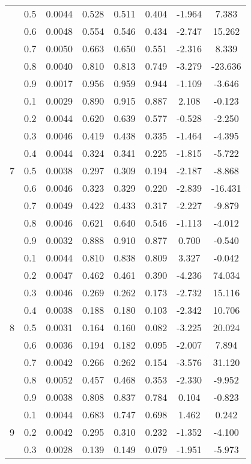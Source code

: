 \documentclass[11pt,a4paper]{report}
\begin{document}
\begin{longtable}{ | c | c || c | c | c | c | c | c | }
 & 0.5 & 0.0044 & 0.528 & 0.511 & 0.404 & -1.964 & 7.383 \\
 & 0.6 & 0.0048 & 0.554 & 0.546 & 0.434 & -2.747 & 15.262 \\
 & 0.7 & 0.0050 & 0.663 & 0.650 & 0.551 & -2.316 & 8.339 \\
 & 0.8 & 0.0040 & 0.810 & 0.813 & 0.749 & -3.279 & -23.636 \\
 & 0.9 & 0.0017 & 0.956 & 0.959 & 0.944 & -1.109 & -3.646 \\
 \hline
\multirow{9}{*}{7} & 0.1 & 0.0029 & 0.890 & 0.915 & 0.887 & 2.108 & -0.123 \\
 & 0.2 & 0.0044 & 0.620 & 0.639 & 0.577 & -0.528 & -2.250 \\
 & 0.3 & 0.0046 & 0.419 & 0.438 & 0.335 & -1.464 & -4.395 \\
 & 0.4 & 0.0044 & 0.324 & 0.341 & 0.225 & -1.815 & -5.722 \\
 & 0.5 & 0.0038 & 0.297 & 0.309 & 0.194 & -2.187 & -8.868 \\
 & 0.6 & 0.0046 & 0.323 & 0.329 & 0.220 & -2.839 & -16.431 \\
 & 0.7 & 0.0049 & 0.422 & 0.433 & 0.317 & -2.227 & -9.879 \\
 & 0.8 & 0.0046 & 0.621 & 0.640 & 0.546 & -1.113 & -4.012 \\
 & 0.9 & 0.0032 & 0.888 & 0.910 & 0.877 & 0.700 & -0.540 \\
 \hline
\multirow{9}{*}{8} & 0.1 & 0.0044 & 0.810 & 0.838 & 0.809 & 3.327 & -0.042 \\
 & 0.2 & 0.0047 & 0.462 & 0.461 & 0.390 & -4.236 & 74.034 \\
 & 0.3 & 0.0046 & 0.269 & 0.262 & 0.173 & -2.732 & 15.116 \\
 & 0.4 & 0.0038 & 0.188 & 0.180 & 0.103 & -2.342 & 10.706 \\
 & 0.5 & 0.0031 & 0.164 & 0.160 & 0.082 & -3.225 & 20.024 \\
 & 0.6 & 0.0036 & 0.194 & 0.182 & 0.095 & -2.007 & 7.894 \\
 & 0.7 & 0.0042 & 0.266 & 0.262 & 0.154 & -3.576 & 31.120 \\
 & 0.8 & 0.0052 & 0.457 & 0.468 & 0.353 & -2.330 & -9.952 \\
 & 0.9 & 0.0038 & 0.808 & 0.837 & 0.784 & 0.104 & -0.823 \\
 \hline
\multirow{9}{*}{9} & 0.1 & 0.0044 & 0.683 & 0.747 & 0.698 & 1.462 & 0.242 \\
 & 0.2 & 0.0042 & 0.295 & 0.310 & 0.232 & -1.352 & -4.100 \\
 & 0.3 & 0.0028 & 0.139 & 0.149 & 0.079 & -1.951 & -5.973 \\

\end{longtable}
\end{document}
